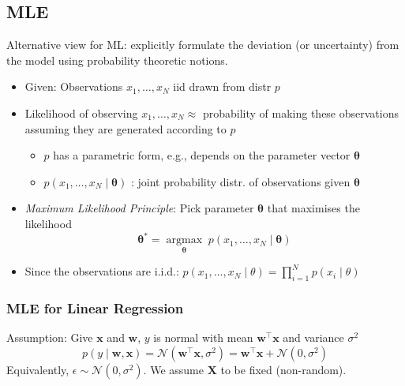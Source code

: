 \documentclass[11pt, %
	oneside, %
	english, %
	onehalfspacing, %
	parskip, %
	]{article} %
\theoremstyle{definition}
\begin{document}
\subsection{MLE}

Alternative view for ML: explicitly formulate the deviation (or uncertainty) from the model using probability theoretic notions.

\begin{itemize}
	\item Given: Observations $x_1, \ldots, x_N$ iid drawn from distr $p$
	\item Likelihood of observing $x_1, \ldots, x_N \approx$ probability of making these observations assuming they are generated according to $p$
	\begin{itemize}
		\item $p$ has a parametric form, e.g., depends on the parameter vector $\boldsymbol{\theta}$
		\item $p\left(x_1, \ldots, x_N \mid \boldsymbol{\theta}\right)$ : joint probability distr. of observations given $\boldsymbol{\theta}$
	\end{itemize}
	\item \emph{Maximum Likelihood Principle}: Pick parameter $\boldsymbol{\theta}$ that maximises the likelihood
	$$
	\boldsymbol{\theta}^*=\underset{\boldsymbol{\theta}}{\operatorname{argmax}} \; p\left(x_1, \ldots, x_N \mid \boldsymbol{\theta}\right)
	$$
	\item Since the observations are i.i.d.: $p\left(x_1, \ldots, x_N \mid \theta\right)=\prod_{i=1}^N p\left(x_i \mid \theta\right)$
\end{itemize}


\subsubsection*{MLE for Linear Regression}

Assumption: Give $\mathbf{x}$ and $\mathbf{w}$, $y$  is normal with mean $\mathbf{w}^{\top} \mathbf{x}$ and variance $\sigma^2$
$$
p(y \mid \mathbf{w}, \mathbf{x})=\mathcal{N}\left(\mathbf{w}^{\top} \mathbf{x}, \sigma^2\right)=\mathbf{w}^{\top} \mathbf{x}+\mathcal{N}\left(0, \sigma^2\right)
$$
Equivalently, $\epsilon \sim \mathcal{N}\left(0, \sigma^2\right)$. We assume $\mathbf{X}$ to be fixed (non-random).
\end{document}
